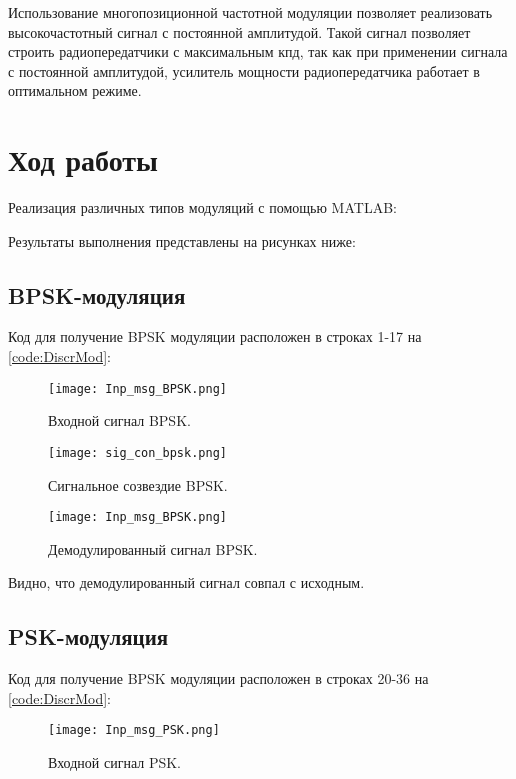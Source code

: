 Использование многопозиционной частотной модуляции позволяет реализовать высокочастотный сигнал с постоянной амплитудой. Такой сигнал позволяет строить радиопередатчики с максимальным кпд, так как при применении сигнала с постоянной амплитудой, усилитель мощности радиопередатчика работает в оптимальном режиме.

\section{Ход работы}

Реализация различных типов модуляций с помощью MATLAB:



Результаты выполнения представлены на рисунках ниже:

\subsection{BPSK-модуляция}
 Код для получение BPSK модуляции расположен в строках 1-17 на \ref{code:DiscrMod}:
\begin{figure}[H]
	\begin{center}
		\texttt{[image: Inp\_msg\_BPSK.png]}
		\caption{Входной сигнал BPSK.} %
		\label{Inp_msg_BPSK} %
	\end{center}
\end{figure}

\begin{figure}[H]
	\begin{center}
		\texttt{[image: sig\_con\_bpsk.png]}
		\caption{Сигнальное созвездие BPSK.} %
		\label{sig_con_bpsk} %
	\end{center}
\end{figure}

\begin{figure}[H]
	\begin{center}
		\texttt{[image: Inp\_msg\_BPSK.png]}
		\caption{Демодулированный сигнал BPSK.} %
		\label{Inp_msg_BPSK} %
	\end{center}
\end{figure}
Видно, что демодулированный сигнал совпал с исходным.

\subsection{PSK-модуляция}
 Код для получение BPSK модуляции расположен в строках 20-36 на \ref{code:DiscrMod}:
\begin{figure}[H]
	\begin{center}
		\texttt{[image: Inp\_msg\_PSK.png]}
		\caption{Входной сигнал PSK.} %
		\label{Inp_msg_PSK} %
	\end{center}
\end{figure}
 
